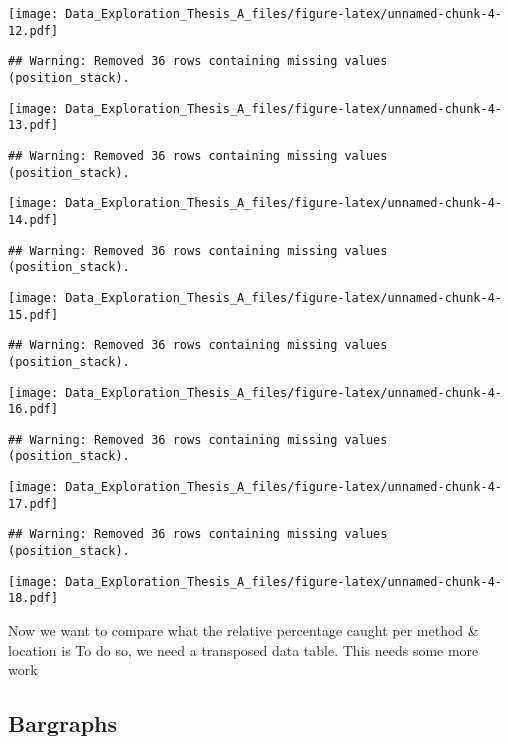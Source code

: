 \documentclass[]{article}
\begin{document}
\texttt{[image: Data\_Exploration\_Thesis\_A\_files/figure-latex/unnamed-chunk-4-12.pdf]}

\begin{verbatim}
## Warning: Removed 36 rows containing missing values (position_stack).
\end{verbatim}

\texttt{[image: Data\_Exploration\_Thesis\_A\_files/figure-latex/unnamed-chunk-4-13.pdf]}

\begin{verbatim}
## Warning: Removed 36 rows containing missing values (position_stack).
\end{verbatim}

\texttt{[image: Data\_Exploration\_Thesis\_A\_files/figure-latex/unnamed-chunk-4-14.pdf]}

\begin{verbatim}
## Warning: Removed 36 rows containing missing values (position_stack).
\end{verbatim}

\texttt{[image: Data\_Exploration\_Thesis\_A\_files/figure-latex/unnamed-chunk-4-15.pdf]}

\begin{verbatim}
## Warning: Removed 36 rows containing missing values (position_stack).
\end{verbatim}

\texttt{[image: Data\_Exploration\_Thesis\_A\_files/figure-latex/unnamed-chunk-4-16.pdf]}

\begin{verbatim}
## Warning: Removed 36 rows containing missing values (position_stack).
\end{verbatim}

\texttt{[image: Data\_Exploration\_Thesis\_A\_files/figure-latex/unnamed-chunk-4-17.pdf]}

\begin{verbatim}
## Warning: Removed 36 rows containing missing values (position_stack).
\end{verbatim}

\texttt{[image: Data\_Exploration\_Thesis\_A\_files/figure-latex/unnamed-chunk-4-18.pdf]}

Now we want to compare what the relative percentage caught per method \&
location is To do so, we need a transposed data table. This needs some
more work

\subsection{Bargraphs}\label{bargraphs}
\end{document}
